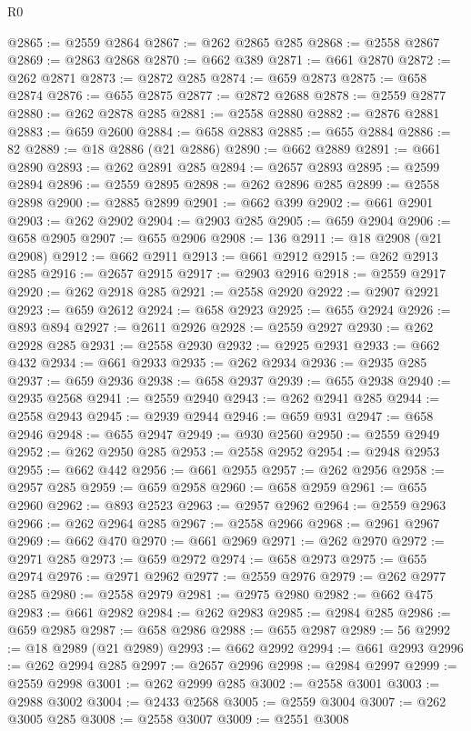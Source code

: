 \begin{lexlean}{R0}
\begin{coremodule}
@2865 := @2559 @2864
@2867 := @262 @2865 @285
@2868 := @2558 @2867
@2869 := @2863 @2868
@2870 := @662 @389
@2871 := @661 @2870
@2872 := @262 @2871
@2873 := @2872 @285
@2874 := @659 @2873
@2875 := @658 @2874
@2876 := @655 @2875
@2877 := @2872 @2688
@2878 := @2559 @2877
@2880 := @262 @2878 @285
@2881 := @2558 @2880
@2882 := @2876 @2881
@2883 := @659 @2600
@2884 := @658 @2883
@2885 := @655 @2884
@2886 := 82
@2889 := @18 @2886 (@21 @2886)
@2890 := @662 @2889
@2891 := @661 @2890
@2893 := @262 @2891 @285
@2894 := @2657 @2893
@2895 := @2599 @2894
@2896 := @2559 @2895
@2898 := @262 @2896 @285
@2899 := @2558 @2898
@2900 := @2885 @2899
@2901 := @662 @399
@2902 := @661 @2901
@2903 := @262 @2902
@2904 := @2903 @285
@2905 := @659 @2904
@2906 := @658 @2905
@2907 := @655 @2906
@2908 := 136
@2911 := @18 @2908 (@21 @2908)
@2912 := @662 @2911
@2913 := @661 @2912
@2915 := @262 @2913 @285
@2916 := @2657 @2915
@2917 := @2903 @2916
@2918 := @2559 @2917
@2920 := @262 @2918 @285
@2921 := @2558 @2920
@2922 := @2907 @2921
@2923 := @659 @2612
@2924 := @658 @2923
@2925 := @655 @2924
@2926 := @893 @894
@2927 := @2611 @2926
@2928 := @2559 @2927
@2930 := @262 @2928 @285
@2931 := @2558 @2930
@2932 := @2925 @2931
@2933 := @662 @432
@2934 := @661 @2933
@2935 := @262 @2934
@2936 := @2935 @285
@2937 := @659 @2936
@2938 := @658 @2937
@2939 := @655 @2938
@2940 := @2935 @2568
@2941 := @2559 @2940
@2943 := @262 @2941 @285
@2944 := @2558 @2943
@2945 := @2939 @2944
@2946 := @659 @931
@2947 := @658 @2946
@2948 := @655 @2947
@2949 := @930 @2560
@2950 := @2559 @2949
@2952 := @262 @2950 @285
@2953 := @2558 @2952
@2954 := @2948 @2953
@2955 := @662 @442
@2956 := @661 @2955
@2957 := @262 @2956
@2958 := @2957 @285
@2959 := @659 @2958
@2960 := @658 @2959
@2961 := @655 @2960
@2962 := @893 @2523
@2963 := @2957 @2962
@2964 := @2559 @2963
@2966 := @262 @2964 @285
@2967 := @2558 @2966
@2968 := @2961 @2967
@2969 := @662 @470
@2970 := @661 @2969
@2971 := @262 @2970
@2972 := @2971 @285
@2973 := @659 @2972
@2974 := @658 @2973
@2975 := @655 @2974
@2976 := @2971 @2962
@2977 := @2559 @2976
@2979 := @262 @2977 @285
@2980 := @2558 @2979
@2981 := @2975 @2980
@2982 := @662 @475
@2983 := @661 @2982
@2984 := @262 @2983
@2985 := @2984 @285
@2986 := @659 @2985
@2987 := @658 @2986
@2988 := @655 @2987
@2989 := 56
@2992 := @18 @2989 (@21 @2989)
@2993 := @662 @2992
@2994 := @661 @2993
@2996 := @262 @2994 @285
@2997 := @2657 @2996
@2998 := @2984 @2997
@2999 := @2559 @2998
@3001 := @262 @2999 @285
@3002 := @2558 @3001
@3003 := @2988 @3002
@3004 := @2433 @2568
@3005 := @2559 @3004
@3007 := @262 @3005 @285
@3008 := @2558 @3007
@3009 := @2551 @3008

\end{coremodule}
\end{lexlean}
